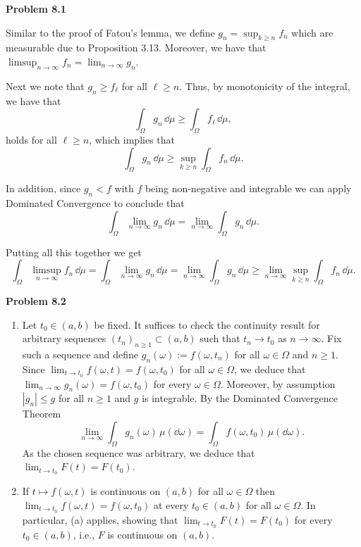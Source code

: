    
\textbf{Problem 8.1}

Similar to the proof of Fatou's lemma, we define $g_n = \sup_{k \ge n} f_n$ which are measurable due to Proposition 3.13. Moreover, we have that $\limsup_{n \to \infty} f_n = \lim_{n \to \infty} g_n$.

Next we note that $g_n \ge f_\ell$ for all $\ell \ge n$. Thus, by monotonicity of the integral, we have that
\[
	\int_\Omega g_n \, \dd \mu \ge \int_\Omega f_\ell \, \dd \mu,
\]
holds for all $\ell \ge n$, which implies that
\[
	\int_\Omega g_n \, \dd \mu \ge \sup_{k \ge n} \int_\Omega f_n \, \dd \mu.
\]

In addition, since $g_n < f$ with $f$ being non-negative and integrable we can apply Dominated Convergence to conclude that
\[
	\int_\Omega \lim_{n \to \infty} g_n \, \dd \mu = \lim_{n \to \infty} \int_\Omega g_n \, \dd \mu.
\]

Putting all this together we get
\[
	\int_\Omega \limsup_{n \to \infty} f_n \, \dd \mu
	= \int_\Omega \lim_{n \to \infty} g_n \, \dd \mu = \lim_{n \to \infty} \int_\Omega g_n \, \dd \mu \ge \lim_{n \to \infty} \sup_{k \ge n} \int_\Omega f_n \, \dd \mu.
\]

\bigskip

\textbf{Problem 8.2}

\begin{enumerate}[label={(\alph*)}]
	\item Let $t_0\in (a,b)$ be fixed. It suffices to check the continuity result for arbitrary sequences $(t_n)_{n\ge 1} \subset (a, b)$ such that $t_n\to t_0$ as $n\to\infty$. Fix such a sequence and define $g_n(\omega):= f(\omega,t_n)$ for all $\omega\in\Omega$ and $n\ge 1$. Since $\lim_{t\to t_0}f(\omega,t)=f(\omega,t_0)$ for all $\omega\in\Omega$, we deduce that $\lim_{n\to\infty} g_n(\omega) = f(\omega,t_0)$ for every $\omega\in\Omega$. Moreover, by assumption $|g_n| \le g$ for all $n \ge 1$ and $g$ is integrable. By the Dominated Convergence Theorem
\[
	\lim_{n\to\infty} \int_\Omega g_n(\omega)\,\mu(\dd\omega) = \int_\Omega f(\omega,t_0)\,\mu(\dd\omega).
\]
As the chosen sequence was arbitrary, we deduce that $\lim_{t\to t_0} F(t) = F(t_0)$.

	\item If $t\mapsto f(\omega,t)$ is continuous on $(a, b)$ for all $\omega\in\Omega$ then $\lim_{t\to t_0}f(\omega,t)=f(\omega,t_0)$ at every $t_0\in(a,b)$ for all $\omega\in\Omega$. In particular, (a) applies, showing that $\lim_{t\to t_0} F(t) = F(t_0)$ for every $t_0\in (a,b)$, i.e., $F$ is continuous on $(a, b)$.
\end{enumerate}

